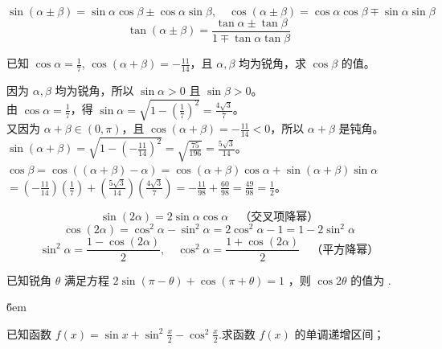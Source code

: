 \begin{theorem}[两角和与差的三角函数]
    $$ \sin(\alpha \pm \beta) = \sin\alpha\cos\beta \pm \cos\alpha\sin\beta, \quad \cos(\alpha \pm \beta) = \cos\alpha\cos\beta \mp \sin\alpha\sin\beta $$
    $$ \tan(\alpha \pm \beta) = \frac{\tan\alpha \pm \tan\beta}{1 \mp \tan\alpha\tan\beta} $$
\end{theorem}

\begin{example}
    已知 $\cos\alpha = \frac{1}{7}$, $\cos(\alpha+\beta)=-\frac{11}{14}$，且 $\alpha, \beta$ 均为锐角，求 $\cos\beta$ 的值。
\end{example}
\begin{solution}
    因为 $\alpha, \beta$ 均为锐角，所以 $\sin\alpha > 0$ 且 $\sin\beta > 0$。\\
    由 $\cos\alpha = \frac{1}{7}$，得 $\sin\alpha = \sqrt{1 - (\frac{1}{7})^2} = \frac{4\sqrt{3}}{7}$。\\
    又因为 $\alpha+\beta \in (0, \pi)$，且 $\cos(\alpha+\beta)=-\frac{11}{14} < 0$，所以 $\alpha+\beta$ 是钝角。\\
    $\sin(\alpha+\beta) = \sqrt{1 - (-\frac{11}{14})^2} = \sqrt{\frac{75}{196}} = \frac{5\sqrt{3}}{14}$。\\
    $\cos\beta = \cos((\alpha+\beta)-\alpha) = \cos(\alpha+\beta)\cos\alpha + \sin(\alpha+\beta)\sin\alpha$
    $= (-\frac{11}{14})(\frac{1}{7}) + (\frac{5\sqrt{3}}{14})(\frac{4\sqrt{3}}{7}) = -\frac{11}{98} + \frac{60}{98} = \frac{49}{98} = \frac{1}{2}$。
\end{solution}
\vspace{2em}


\begin{theorem}[二倍角公式与降幂公式]
    $$ \sin(2\alpha) = 2\sin\alpha\cos\alpha \quad \text{（交叉项降幂）}$$
    $$ \cos(2\alpha) = \cos^2\alpha - \sin^2\alpha = 2\cos^2\alpha - 1 = 1 - 2\sin^2\alpha $$
    $$ \sin^2\alpha = \frac{1-\cos(2\alpha)}{2}, \quad \cos^2\alpha = \frac{1+\cos(2\alpha)}{2} \quad \text{（平方降幂）}$$
\end{theorem}

\begin{example}
    已知锐角 $\theta$ 满足方程 $2 \sin (\pi-\theta)+\cos (\pi+\theta)=1$ ，则 $\cos 2 \theta$ 的值为 \underline{\qquad}.
\end{example}

\v{6em}

\begin{example}
    已知函数 $f(x)=\sin x+\sin ^2 \frac{x}{2}-\cos ^2 \frac{x}{2}$.求函数 $f(x)$ 的单调递增区间；
\end{example}

